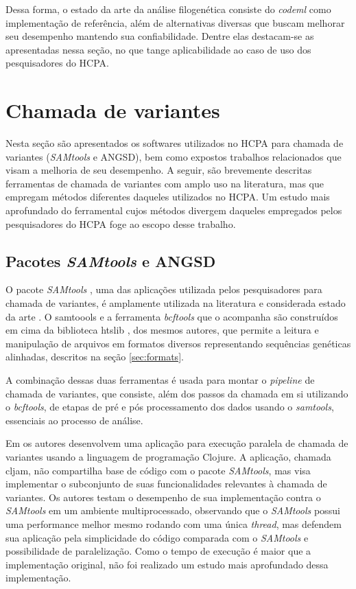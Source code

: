 \documentclass[cic,tc]{iiufrgs}
\begin{document}
Dessa forma, o estado da arte da análise filogenética consiste do \textit{codeml} como
implementação de referência, além de alternativas diversas que buscam melhorar
seu desempenho mantendo sua confiabilidade. Dentre elas destacam-se as
apresentadas nessa seção, no que tange aplicabilidade ao caso de uso dos
pesquisadores do HCPA.

\section{Chamada de variantes}
\label{sec:callant}

Nesta seção são apresentados os softwares utilizados no HCPA para
chamada de variantes (\textit{SAMtools} e ANGSD), bem como expostos trabalhos
relacionados que visam a melhoria de seu desempenho. A seguir, são brevemente
descritas ferramentas de chamada de variantes com amplo uso na literatura, mas
que empregam métodos diferentes daqueles utilizados no HCPA. Um estudo mais
aprofundado do ferramental cujos métodos divergem daqueles empregados pelos
pesquisadores do HCPA foge ao escopo desse trabalho.

\subsection{Pacotes \textit{SAMtools} e ANGSD}

O pacote \textit{SAMtools} \cite{li2009sequence}, uma das aplicações utilizada pelos
pesquisadores para chamada de variantes, é amplamente utilizada na literatura
\cite{danecek2021twelve} e considerada estado da arte \cite{yao2020evaluation}.
O samtoools e a ferramenta \textit{bcftools} que o acompanha são construídos em cima da
biblioteca htslib \cite{bonfield2021htslib}, dos mesmos autores, que permite a
leitura e manipulação de arquivos em formatos diversos representando sequências
genéticas alinhadas, descritos na seção \ref{sec:formats}.

A combinação dessas duas ferramentas é usada para montar o \textit{pipeline} de chamada
de variantes, que consiste, além dos passos da chamada em si utilizando o
\textit{bcftools}, de etapas de pré e pós processamento dos dados usando o \textit{samtools},
essenciais ao processo de análise.

Em \cite{takeuchi2016cljam} os autores desenvolvem uma aplicação para execução
paralela de chamada de variantes usando a linguagem de programação Clojure. A
aplicação, chamada cljam, não compartilha base de código com o pacote \textit{SAMtools},
mas visa implementar o subconjunto de suas funcionalidades relevantes à
chamada de variantes. Os autores testam o desempenho de sua implementação
contra o \textit{SAMtools} em um ambiente multiprocessado, observando que o \textit{SAMtools}
possui uma performance melhor mesmo rodando com uma única \textit{thread}, mas defendem
sua aplicação pela simplicidade do código comparada com o \textit{SAMtools} e
possibilidade de paralelização. Como o tempo de execução é maior que a
implementação original, não foi realizado um estudo mais aprofundado dessa
implementação.
\end{document}
